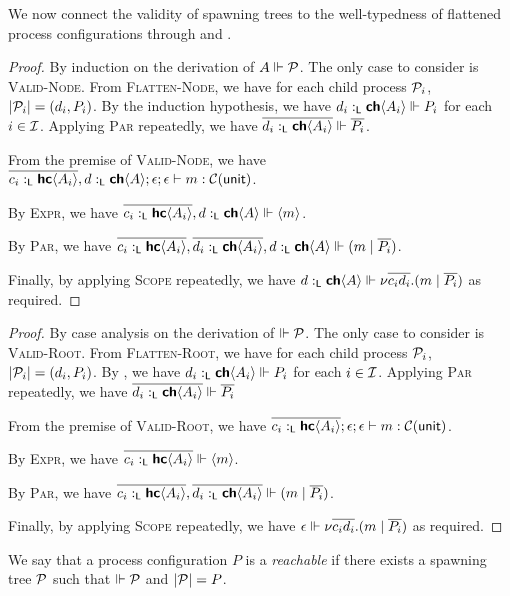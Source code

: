 We now connect the validity of spawning trees to the well-typedness of flattened process configurations
through  and .
\begin{proof}
  By induction on the derivation of $A \Vdash \mathcal{P}$. The only case to consider is \textsc{Valid-Node}.
  From \textsc{Flatten-Node}, we have for each child process $\mathcal{P}_i$, $| \mathcal{P}_i | = (d_i, P_i)$.
  By the induction hypothesis, we have $d_i :_{\textsf{L}} {\textbf{\textsf{ch}}\langle{A_i}\rangle} \Vdash P_i$ for each $i \in \mathcal{I}$.
  Applying \textsc{Par} repeatedly, we have $\overline{d_i :_{\textsf{L}} {\textbf{\textsf{ch}}\langle{A_i}\rangle}} \Vdash \overline{P_i}$.

  \noindent
  From the premise of \textsc{Valid-Node}, we have
  $\overline{c_i :_{\textsf{L}} {\textbf{\textsf{hc}}\langle{A_i}\rangle}}, d :_{\textsf{L}} {\textbf{\textsf{ch}}\langle{A}\rangle} ; \epsilon ; \epsilon \vdash m :\mathcal{C}({\textsf{unit}})$.

  \noindent
  By \textsc{Expr}, we have
  $\overline{c_i :_{\textsf{L}} {\textbf{\textsf{hc}}\langle{A_i}\rangle}}, d :_{\textsf{L}} {\textbf{\textsf{ch}}\langle{A}\rangle} \Vdash {\langle{m}\rangle}$.

  \noindent
  By \textsc{Par}, we have
  $\overline{c_i :_{\textsf{L}} {\textbf{\textsf{hc}}\langle{A_i}\rangle}}, \overline{d_i :_{\textsf{L}} {\textbf{\textsf{ch}}\langle{A_i}\rangle}}, d :_{\textsf{L}} {\textbf{\textsf{ch}}\langle{A}\rangle} \Vdash (m \mid \overline{P_i})$.

  \noindent
  Finally, by applying \textsc{Scope} repeatedly, we have
  $d :_{\textsf{L}} {\textbf{\textsf{ch}}\langle{A}\rangle} \Vdash {\nu{\overline{c_i d_i}}.{(m \mid \overline{P_i})}}$ as required.
\end{proof}

\begin{proof}
  By case analysis on the derivation of $\Vdash \mathcal{P}$. The only case to consider is \textsc{Valid-Root}. 
  From \textsc{Flatten-Root}, we have for each child process $\mathcal{P}_i$, $| \mathcal{P}_i | = (d_i, P_i)$.
  By , we have $d_i :_{\textsf{L}} {\textbf{\textsf{ch}}\langle{A_i}\rangle} \Vdash P_i$ for each $i \in \mathcal{I}$.
  Applying \textsc{Par} repeatedly, we have $\overline{d_i :_{\textsf{L}} {\textbf{\textsf{ch}}\langle{A_i}\rangle}} \Vdash \overline{P_i}$

  \noindent
  From the premise of \textsc{Valid-Root}, we have
  $\overline{c_i :_{\textsf{L}} {\textbf{\textsf{hc}}\langle{A_i}\rangle}} ; \epsilon ; \epsilon \vdash m :\mathcal{C}({\textsf{unit}})$.

  \noindent
  By \textsc{Expr}, we have
  $\overline{c_i :_{\textsf{L}} {\textbf{\textsf{hc}}\langle{A_i}\rangle}} \Vdash {\langle{m}\rangle}$.

  \noindent
  By \textsc{Par}, we have
  $\overline{c_i :_{\textsf{L}} {\textbf{\textsf{hc}}\langle{A_i}\rangle}}, \overline{d_i :_{\textsf{L}} {\textbf{\textsf{ch}}\langle{A_i}\rangle}} \Vdash (m \mid \overline{P_i})$.

  \noindent
  Finally, by applying \textsc{Scope} repeatedly, we have
  $\epsilon \Vdash {\nu{\overline{c_i d_i}}.{(m \mid \overline{P_i})}}$ as required.
\end{proof}

\begin{definition}
  We say that a process configuration $P$ is a \emph{reachable} if there exists a spawning tree $\mathcal{P}$
  such that $\Vdash \mathcal{P}$ and $| \mathcal{P} | = P$.
\end{definition}